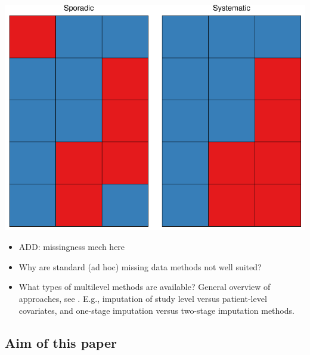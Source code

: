\documentclass[
]{jss}
\begin{document}
\begin{CodeChunk}


\begin{center}\includegraphics{Manuscript_files/figure-latex/patterns-1} \end{center}

\end{CodeChunk}

\begin{itemize}
\item
  ADD: missingness mech here
\item
  Why are standard (ad hoc) missing data methods not well suited?
\item
  What types of multilevel methods are available? General overview of
  approaches, see \citet{audi18} \citet{grun18}. E.g., imputation of
  study level versus patient-level covariates, and one-stage imputation
  versus two-stage imputation methods.
\end{itemize}

\hypertarget{aim-of-this-paper}{%
\subsection{Aim of this paper}\label{aim-of-this-paper}}
\end{document}
